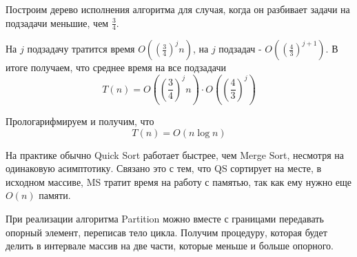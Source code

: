 \documentclass[../main.tex]{subfiles}
\begin{document}
	\begin{time}
		Построим дерево исполнения алгоритма для случая, когда он разбивает задачи на подзадачи меньшие, чем $\frac{3}{4}$.
		
		\begin{center}
		\end{center}
		
		На $j$ подзадачу тратится время $O((\frac{3}{4})^jn)$, на $j$ подзадач - $O((\frac{4}{3})^{j + 1})$. В итоге получаем, что среднее время на все подзадачи
		\[
		T(n) = 	O\left(
					\left(
						\frac{3}{4}
					\right)^jn
					\right)
				\cdot 
				O\left(
					\left(
						\frac{4}{3}
					\right)^j
				\right)
		\]
		
		Прологарифмируем и получим, что
		\[
		T(n) = O(n\log n)
		\]
	\end{time}
	
	На практике обычно Quick Sort работает быстрее, чем Merge Sort, несмотря на одинаковую асимптотику. Связано это с тем, что QS сортирует на месте, в исходном массиве, MS тратит время на работу с памятью, так как ему нужно еще $O(n)$ памяти.
	
	
	\begin{remark}
		При реализации алгоритма Partition можно вместе с границами передавать опорный элемент, переписав тело цикла. Получим процедуру, которая будет делить в интервале массив на две части, которые меньше и больше опорного.
	\end{remark}
	
\end{document}
